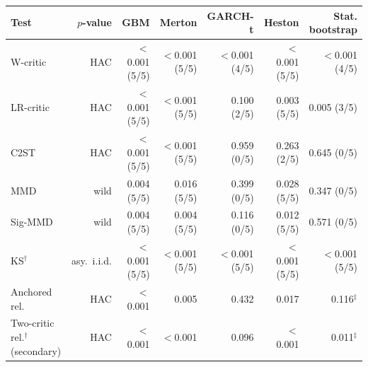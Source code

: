\begin{tabular}{lrrrrrr}
\toprule
Test & $p$-value & GBM & Merton & GARCH-t & Heston & Stat. bootstrap \\
\midrule
W-critic & HAC & $<$0.001 (5/5) & $<$0.001 (5/5) & $<$0.001 (4/5) & $<$0.001 (5/5) & $<$0.001 (4/5) \\
LR-critic & HAC & $<$0.001 (5/5) & $<$0.001 (5/5) & 0.100 (2/5) & 0.003 (5/5) & 0.005 (3/5) \\
C2ST & HAC & $<$0.001 (5/5) & $<$0.001 (5/5) & 0.959 (0/5) & 0.263 (2/5) & 0.645 (0/5) \\
MMD & wild & 0.004 (5/5) & 0.016 (5/5) & 0.399 (0/5) & 0.028 (5/5) & 0.347 (0/5) \\
Sig-MMD & wild & 0.004 (5/5) & 0.004 (5/5) & 0.116 (0/5) & 0.012 (5/5) & 0.571 (0/5) \\
KS$^{\dagger}$ & asy.\ i.i.d. & $<$0.001 (5/5) & $<$0.001 (5/5) & $<$0.001 (5/5) & $<$0.001 (5/5) & $<$0.001 (5/5) \\
Anchored rel. & HAC & $<$0.001 & 0.005 & 0.432 & 0.017 & 0.116$^{\ddagger}$ \\
Two-critic rel.$^{\dagger}$ (secondary) & HAC & $<$0.001 & $<$0.001 & 0.096 & $<$0.001 & 0.011$^{\ddagger}$ \\
\bottomrule
\end{tabular}
